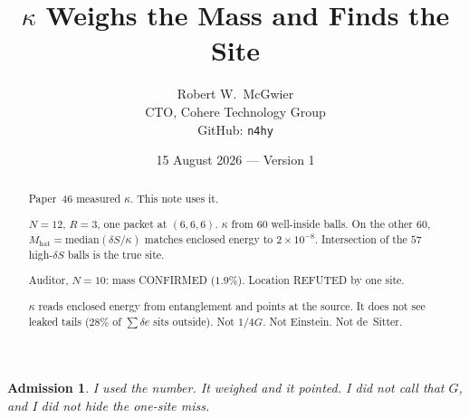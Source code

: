 \documentclass[11pt]{article}
\title{\textbf{$\kappa$ Weighs the Mass and Finds the Site}}
\author{Robert W.\ McGwier\\
\small CTO, Cohere Technology Group\\
\small GitHub: \texttt{n4hy}}
\date{15 August 2026 --- Version 1}
\newtheorem*{admission}{Admission}
\begin{document}
\maketitle

\begin{abstract}
\noindent
Paper~46 measured $\kappa$. This note uses it.

$N=12$, $R=3$, one packet at $(6,6,6)$. $\kappa$ from
$60$ well-inside balls. On the other $60$,
$M_{\mathrm{hat}}=\mathrm{median}(\delta S/\kappa)$ matches
enclosed energy to $2\times 10^{-8}$. Intersection of the
$57$ high-$\delta S$ balls is the true site.

Auditor, $N=10$: mass CONFIRMED ($1.9\%$). Location
REFUTED by one site.

$\kappa$ reads enclosed energy from entanglement and
points at the source. It does not see leaked tails
($28\%$ of $\sum\delta e$ sits outside). Not $1/4G$.
Not Einstein. Not de~Sitter.
\end{abstract}

\begin{admission}
I used the number. It weighed and it pointed. I did not
call that $G$, and I did not hide the one-site miss.
\end{admission}
\end{document}
